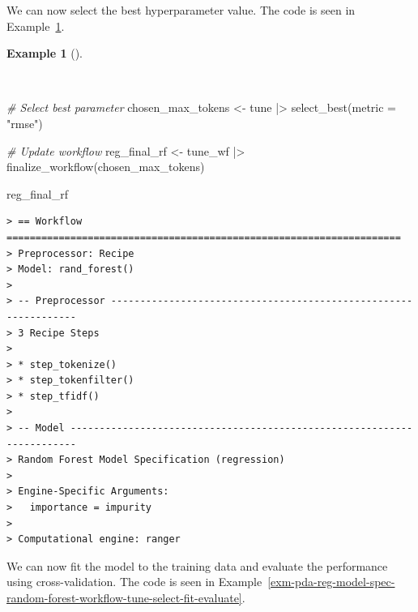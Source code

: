 \documentclass[
  letterpaper,
  DIV=11,
  numbers=noendperiod]{scrreprt}
\newenvironment{Shaded}{\begin{snugshade}}{\end{snugshade}}
\newcommand{\AttributeTok}[1]{\textcolor[rgb]{0.00,0.00,0.00}{#1}}
\newcommand{\CommentTok}[1]{\textcolor[rgb]{0.00,0.00,0.00}{\textit{#1}}}
\newcommand{\FunctionTok}[1]{\textcolor[rgb]{0.00,0.00,0.00}{#1}}
\newcommand{\NormalTok}[1]{\textcolor[rgb]{0.00,0.00,0.00}{#1}}
\newcommand{\OtherTok}[1]{\textcolor[rgb]{0.00,0.00,0.00}{#1}}
\newcommand{\SpecialCharTok}[1]{\textcolor[rgb]{0.00,0.00,0.00}{#1}}
\newcommand{\StringTok}[1]{\textcolor[rgb]{0.00,0.00,0.00}{#1}}
\theoremstyle{definition}
\newtheorem{example}{Example}[chapter]
\theoremstyle{remark}
\begin{document}
We can now select the best hyperparameter value. The code is seen in
Example~\ref{exm-pda-reg-model-spec-random-forest-workflow-tune-select}.

\begin{example}[]\protect\hypertarget{exm-pda-reg-model-spec-random-forest-workflow-tune-select}{}\label{exm-pda-reg-model-spec-random-forest-workflow-tune-select}

~

\begin{Shaded}
\begin{Highlighting}[]
\CommentTok{\# Select best parameter}
\NormalTok{chosen\_max\_tokens }\OtherTok{\textless{}{-}}
\NormalTok{  tune }\SpecialCharTok{|\textgreater{}}
  \FunctionTok{select\_best}\NormalTok{(}\AttributeTok{metric =} \StringTok{"rmse"}\NormalTok{)}

\CommentTok{\# Update workflow}
\NormalTok{reg\_final\_rf }\OtherTok{\textless{}{-}}
\NormalTok{  tune\_wf }\SpecialCharTok{|\textgreater{}}
  \FunctionTok{finalize\_workflow}\NormalTok{(chosen\_max\_tokens)}

\NormalTok{reg\_final\_rf}
\end{Highlighting}
\end{Shaded}

\begin{verbatim}
> == Workflow ====================================================================
> Preprocessor: Recipe
> Model: rand_forest()
> 
> -- Preprocessor ----------------------------------------------------------------
> 3 Recipe Steps
> 
> * step_tokenize()
> * step_tokenfilter()
> * step_tfidf()
> 
> -- Model -----------------------------------------------------------------------
> Random Forest Model Specification (regression)
> 
> Engine-Specific Arguments:
>   importance = impurity
> 
> Computational engine: ranger
\end{verbatim}

\end{example}

We can now fit the model to the training data and evaluate the
performance using cross-validation. The code is seen in
Example~\ref{exm-pda-reg-model-spec-random-forest-workflow-tune-select-fit-evaluate}.
\end{document}
